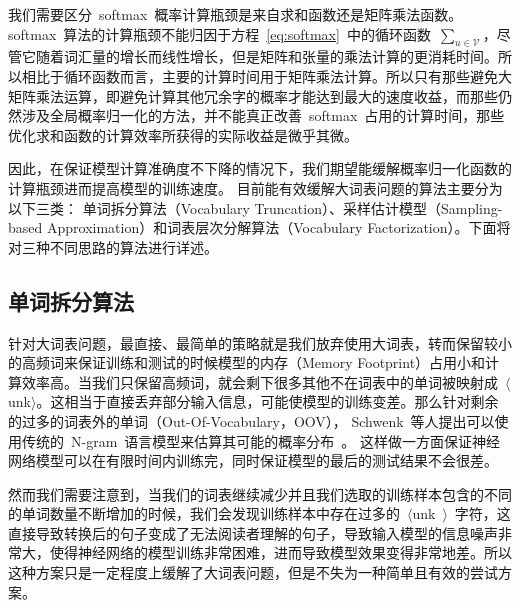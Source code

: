 我们需要区分~softmax~概率计算瓶颈是来自求和函数还是矩阵乘法函数。
softmax~算法的计算瓶颈不能归因于方程~\ref{eq:softmax}~中的循环函数~$\sum_ {u \in \mathcal {V}}$，尽管它随着词汇量的增长而线性增长，但是矩阵和张量的乘法计算的更消耗时间。所以相比于循环函数而言，主要的计算时间用于矩阵乘法计算。所以只有那些避免大矩阵乘法运算，即避免计算其他冗余字的概率才能达到最大的速度收益，而那些仍然涉及全局概率归一化的方法，并不能真正改善~softmax~占用的计算时间，那些优化求和函数的计算效率所获得的实际收益是微乎其微。


因此，在保证模型计算准确度不下降的情况下，我们期望能缓解概率归一化函数的计算瓶颈进而提高模型的训练速度。 目前能有效缓解大词表问题的算法主要分为以下三类： 单词拆分算法（Vocabulary Truncation）、采样估计模型（Sampling-based Approximation）和词表层次分解算法（Vocabulary Factorization）。下面将对三种不同思路的算法进行详述。



\subsection{单词拆分算法}
针对大词表问题，最直接、最简单的策略就是我们放弃使用大词表，转而保留较小的高频词来保证训练和测试的时候模型的内存（Memory Footprint）占用小和计算效率高。当我们只保留高频词，就会剩下很多其他不在词表中的单词被映射成~$\langle$unk$\rangle$。这相当于直接丢弃部分输入信息，可能使模型的训练变差。那么针对剩余的过多的词表外的单词（Out-Of-Vocabulary，OOV）， Schwenk~等人提出可以使用传统的~N-gram~语言模型来估算其可能的概率分布~。
这样做一方面保证神经网络模型可以在有限时间内训练完，同时保证模型的最后的测试结果不会很差。

然而我们需要注意到，当我们的词表继续减少并且我们选取的训练样本包含的不同的单词数量不断增加的时候，我们会发现训练样本中存在过多的~$\langle$unk~$\rangle$~字符，这直接导致转换后的句子变成了无法阅读者理解的句子，导致输入模型的信息噪声非常大，使得神经网络的模型训练非常困难，进而导致模型效果变得非常地差。所以这种方案只是一定程度上缓解了大词表问题，但是不失为一种简单且有效的尝试方案。

